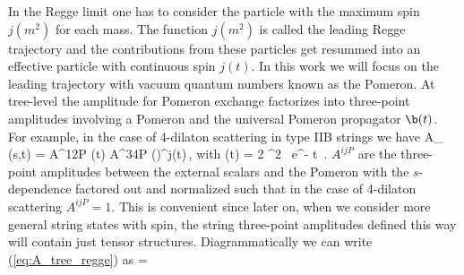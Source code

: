 In the Regge limit one has to consider the particle with the maximum spin $j(m^2)$ for each mass. The function $j(m^2)$ is called the leading Regge trajectory and the contributions from these particles get resummed into an effective particle with continuous spin $j(t)$.
In this work we will focus on the leading trajectory with   vacuum  quantum numbers known as the Pomeron.
At tree-level the amplitude for Pomeron exchange factorizes into three-point amplitudes involving a Pomeron and the universal Pomeron propagator $\b(t)$. For example,  in the case of 4-dilaton scattering in type IIB strings we have
\beq
 A_ (s,t)  =    A^{12P} \beta(t) A^{34P} \left(\right)^{j(t)}\,,
\label{eq:A_tree_regge}
\eeq
with
	\beq
		\beta(t) =   2 \pi^2 \,
		e^{-  t} \,.
		\label{eq:pomeron_propagator}
	\eeq
$A^{ijP}$ are the three-point amplitudes between the external scalars and the Pomeron with the 
 $s$-dependence factored out and normalized such that in the case of 4-dilaton scattering   $A^{ijP}=1$. 
 This is convenient since later on, when we consider more general string states with spin, 
the string three-point amplitudes defined this way will contain just tensor structures.
Diagrammatically we can write (\ref{eq:A_tree_regge}) as
\beq
=
\times
